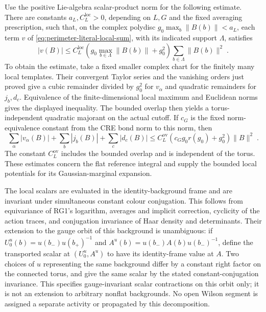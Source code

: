 \documentclass[11pt]{article}
\begin{document}
Use the positive Lie-algebra scalar-product norm for the following estimate. There are constants $a_L,C_L^{\mathrm{loc}}>0$, depending on $L,G$ and the fixed averaging prescription, such that, on the complex polydisc $g_0\max_b\|B(b)\|<a_L$, each term $v$ of \eqref{eq:perimeter-literal-local-sum}, with its indicated support $\Lambda$, satisfies
\begin{equation}\label{eq:perimeter-literal-local-bound}
    |v(B)|\leq C_L^{\mathrm{loc}}
        \left(g_0\max_{b\in\Lambda}\|B(b)\|+g_0^2\right)
        \sum_{b\in\Lambda}\|B(b)\|^2\;.
\end{equation}
To obtain the estimate, take a fixed smaller complex chart for the finitely many local templates. Their convergent Taylor series and the vanishing orders just proved give a cubic remainder divided by $g_0^2$ for $v_\alpha$ and quadratic remainders for $j_b,d_c$. Equivalence of the finite-dimensional local maximum and Euclidean norms gives the displayed inequality. The bounded overlap then yields a torus-independent quadratic majorant on the actual cutoff. If $c_G$ is the fixed norm-equivalence constant from the CRE bond norm to this norm, then
\begin{equation}\label{eq:perimeter-literal-total-reserve}
    \sum_\alpha|v_\alpha(B)|+\sum_b|j_b(B)|+\sum_c|d_c(B)|
        \leq C_L^{\mathrm{ov}}
            (c_Gg_0r(g_0)+g_0^2)\|B\|^2\;.
\end{equation}
The constant $C_L^{\mathrm{ov}}$ includes the bounded overlap and is independent of the torus. These estimates concern the flat reference integral and supply the bounded local potentials for its Gaussian-marginal expansion.

The local scalars are evaluated in the identity-background frame and are invariant under simultaneous constant colour conjugation. This follows from equivariance of RG1's logarithm, averages and implicit correction, cyclicity of the action traces, and conjugation invariance of Haar density and determinants. Their extension to the gauge orbit of this background is unambiguous: if $U^u_0(b)=u(b_-)u(b_+)^{-1}$ and $A^u(b)=u(b_-)A(b)u(b_-)^{-1}$, define the transported scalar at $(U^u_0,A^u)$ to have its identity-frame value at $A$. Two choices of $u$ representing the same background differ by a constant right factor on the connected torus, and give the same scalar by the stated constant-conjugation invariance. This specifies gauge-invariant scalar contractions on this orbit only; it is not an extension to arbitrary nonflat backgrounds. No open Wilson segment is assigned a separate activity or propagated by this decomposition.
\end{document}
